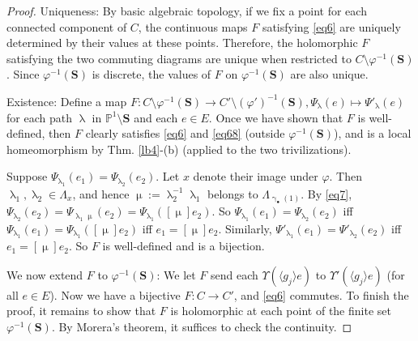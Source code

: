 \documentclass[11pt,b5paper,notitlepage]{article}
\theoremstyle{definition}
\theoremstyle{plain}
\newcommand{\bk}[1]{\langle {#1}\rangle}
\newcommand{\blt}{\bullet}
\newcommand{\Pbb}{\mathbb P}
\newcommand{\Sbf}{\mathbf{S}}
\numberwithin{equation}{subsection}
\begin{document}
\begin{proof}
Uniqueness: By basic algebraic topology, if we fix a point for each connected component of $C$, the  continuous maps $F$ satisfying \eqref{eq6} are uniquely determined by their values at these points. Therefore, the holomorphic $F$ satisfying the two commuting diagrams are unique when  restricted to $C\setminus\varphi^{-1}(\Sbf)$. Since $\varphi^{-1}(\Sbf)$ is discrete, the values of $F$ on 	$\varphi^{-1}(\Sbf)$ are also unique.
	
Existence: Define a map $F:C\setminus\varphi^{-1}(\Sbf)\rightarrow C'\setminus(\varphi')^{-1}(\Sbf),\Psi_\uplambda(e)\mapsto \Psi'_\uplambda(e)$ for each path $\uplambda$ in $\Pbb^1\setminus\Sbf$ and each $e\in E$. Once we have shown that $F$ is well-defined, then $F$ clearly satisfies \eqref{eq6} and \eqref{eq68} (outside $\varphi^{-1}(\Sbf)$), and is a local homeomorphism by Thm. \ref{lb4}-(b) (applied to the two trivilizations).

Suppose $\Psi_{\uplambda_1}(e_1)=\Psi_{\uplambda_2}(e_2)$. Let $x$ denote their image under $\varphi$. Then $\uplambda_1,\uplambda_2\in\Lambda_x$, and hence $\upmu:=\uplambda_2^{-1}\uplambda_1$ belongs to $\Lambda_{\upgamma_\blt(1)}$. By \eqref{eq7}, $\Psi_{\uplambda_2}(e_2)=\Psi_{\uplambda_1\upmu}(e_2)=\Psi_{\uplambda_1}([\upmu]e_2)$. So $\Psi_{\uplambda_1}(e_1)=\Psi_{\uplambda_2}(e_2)$ iff $\Psi_{\uplambda_1}(e_1)=\Psi_{\uplambda_1}([\upmu]e_2)$ iff $e_1=[\upmu]e_2$. Similarly, $\Psi'_{\uplambda_1}(e_1)=\Psi'_{\uplambda_2}(e_2)$ iff $e_1=[\upmu]e_2$. So $F$ is well-defined and is a bijection.


We now extend $F$ to $\varphi^{-1}(\Sbf)$: We let $F$ send each $\Upsilon(\bk{g_j}e)$ to $\Upsilon'(\bk{g_j}e)$ (for all $e\in E$). Now we have a bijective $F:C\rightarrow C'$, and \eqref{eq6} commutes. To finish the proof, it remains to show that $F$ is holomorphic at each point of the finite set $\varphi^{-1}(\Sbf)$. By Morera's theorem, it suffices to check the continuity.


\end{proof}
\end{document}
